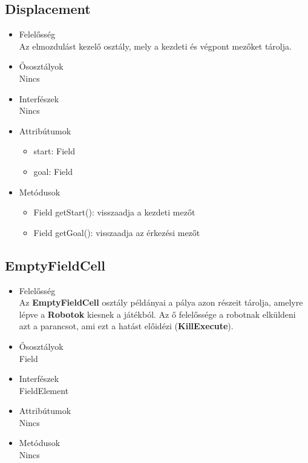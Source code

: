 \subsection{Displacement}
\begin{itemize}

\item Felelősség\\
Az elmozdulást kezelő osztály, mely a kezdeti és végpont mezőket tárolja.

\item Ősosztályok\\
Nincs

\item Interfészek\\
Nincs

\item Attribútumok\\
    \begin{itemize}
            \item start: Field
            \item goal: Field
    \end{itemize}

\item Metódusok\\

\begin{itemize}
    \item Field getStart(): visszaadja a kezdeti mezőt
    \item Field getGoal(): visszaadja az érkezési mezőt
\end{itemize}

\end{itemize}

\subsection{EmptyFieldCell}
\begin{itemize}

\item Felelősség\\
Az \textbf{EmptyFieldCell} osztály példányai a pálya azon részeit tárolja, amelyre lépve a \textbf{Robotok} kiesnek a játékból. Az ő felelőssége a robotnak elküldeni azt a parancsot, ami ezt a hatást előidézi (\textbf{KillExecute}).

\item Ősosztályok\\
Field

\item Interfészek\\
FieldElement

\item Attribútumok\\
Nincs

\item Metódusok\\
Nincs

\end{itemize}


